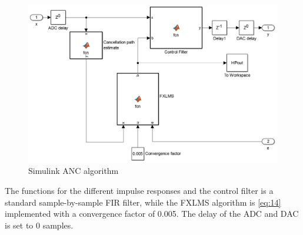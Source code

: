 \begin{figure}[H]
	\centering
	\includegraphics[width=1\textwidth]{figures/BasicSystem/SimulinkANC}
	\caption{Simulink ANC algorithm}
	\label{fig:SimulinkANC}
\end{figure} 

The functions for the different impulse responses and the control filter is a standard sample-by-sample FIR filter, while the FXLMS algorithm is \autoref{eq:14} implemented with a convergence factor of 0.005. The delay of the ADC and DAC is set to 0 samples. 




